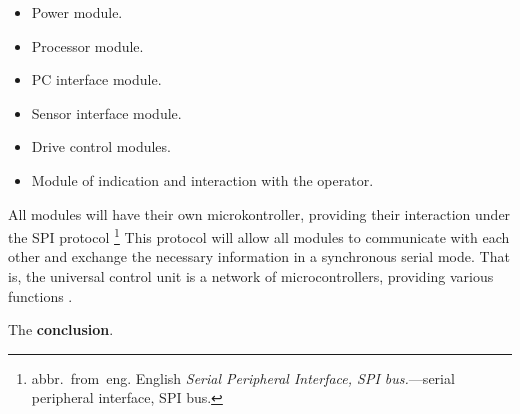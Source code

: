 \begin{itemize}
\item Power module.
\item Processor module.
\item PC interface module.
\item Sensor interface module.
\item Drive control modules.
\item Module of indication and interaction with the operator.
\end{itemize}

All modules will have their own microkontroller, providing their interaction under the SPI protocol \footnote{abbr.~from~eng. English \textit{Serial Peripheral Interface, SPI bus.}---serial peripheral interface, SPI bus.} This protocol will allow all modules to communicate with each other and exchange the necessary information in a synchronous serial mode. That is, the universal control unit is a network of microcontrollers, providing various functions .

\FloatBarrier                      
The \textbf{conclusion}.


